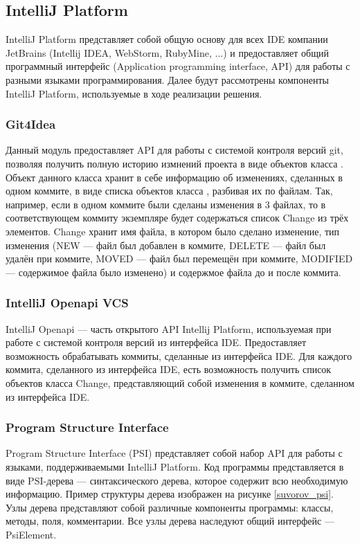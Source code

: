 \documentclass[14pt]{matmex-diploma-custom}
\begin{document}
\subsection{IntelliJ Platform}
IntelliJ Platform представляет собой общую основу для всех IDE компании JetBrains (Intellij IDEA, WebStorm, RubyMine, ...) и предоставляет общий программный интерфейс (Application programming interface, API) для работы с разными языками программирования. Далее будут рассмотрены компоненты IntelliJ Platform, используемые в ходе реализации решения.
\subsubsection*{Git4Idea} 
Данный модуль \cite{git4idea} предоставляет API для работы с системой контроля версий git, позволяя получить полную историю измнений проекта в виде объектов класса . Объект данного класса хранит в себе информацию об изменениях, сделанных в одном коммите, в виде списка объектов класса , разбивая их по файлам. Так, например, если в одном коммите были сделаны изменения в 3 файлах, то в соответствующем коммиту экземпляре  будет содержаться список Change из трёх элементов. Change хранит имя файла, в котором было сделано изменение, тип изменения (NEW --- файл был добавлен в коммите, DELETE --- файл был удалён при коммите, MOVED --- файл был перемещён при коммите, MODIFIED --- содержимое файла было изменено) и содержмое файла до и после коммита. 

\subsubsection*{IntelliJ Openapi VCS}
IntelliJ Openapi --- часть открытого API Intellij Platform, используемая при работе с системой контроля версий из интерфейса IDE. Предоставляет возможность обрабатывать коммиты, сделанные из интерфейса IDE. Для каждого коммита, сделанного из интерфейса IDE, есть возможность получить список объектов класса Change, представляющий собой изменения в коммите, сделанном из интерфейса IDE.

\subsubsection*{Program Structure Interface}
Program Structure Interface (PSI) представляет собой набор API для работы с языками, поддерживаемыми IntelliJ Platform. Код программы представляется в виде PSI-дерева --- синтаксического дерева, которое содержит всю необходимую информацию. Пример структуры дерева изображен на рисунке \ref{suvorov_psi}. Узлы дерева представляют собой различные компоненты программы: классы, методы, поля, комментарии. Все узлы дерева наследуют общий интерфейс --- PsiElement.
\end{document}
